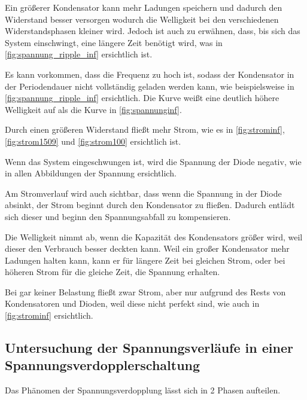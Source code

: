 \documentclass[11pt,ngerman]{scrartcl}
\begin{document}
Ein größerer Kondensator kann mehr Ladungen speichern und dadurch den Widerstand besser versorgen wodurch die Welligkeit bei den verschiedenen Widerstandsphasen kleiner wird.
Jedoch ist auch zu erwähnen, dass, bis sich das System einschwingt, eine längere Zeit benötigt wird, was in \autoref{fig:spannung_ripple_inf} ersichtlich ist.

Es kann vorkommen, dass die Frequenz zu hoch ist, sodass der Kondensator in der Periodendauer nicht vollständig geladen werden kann, wie beispielsweise in \autoref{fig:spannung_ripple_inf} ersichtlich. Die Kurve weißt eine deutlich höhere Welligkeit auf als die Kurve in \autoref{fig:spannunginf}.

\vspace{2mm}


Durch einen größeren Widerstand fließt mehr Strom, wie es in \autoref{fig:strominf}, \autoref{fig:strom1509} und \autoref{fig:strom100} ersichtlich ist.

Wenn das System eingeschwungen ist, wird die Spannung der Diode negativ, wie in allen Abbildungen der Spannung ersichtlich.

\vspace{2mm}

Am Stromverlauf wird auch sichtbar, dass wenn die Spannung in der Diode absinkt, der Strom beginnt durch den Kondensator zu fließen. Dadurch entlädt sich dieser und beginn den Spannungsabfall zu kompensieren.

Die Welligkeit nimmt ab, wenn die Kapazität des Kondensators größer wird, weil dieser den Verbrauch besser deckten kann.
Weil ein großer Kondensator mehr Ladungen halten kann, kann er für längere Zeit bei gleichen Strom, oder bei höheren Strom für die gleiche Zeit, die Spannung erhalten.

\vspace{2mm}

Bei gar keiner Belastung fließt zwar Strom, aber nur aufgrund des Rests von Kondensatoren und Dioden, weil diese nicht perfekt sind, wie auch in \autoref{fig:strominf} ersichtlich.



\subsection{Untersuchung der Spannungsverläufe in einer Spannungsverdopplerschaltung}



Das Phänomen der Spannungsverdopplung lässt sich in 2 Phasen aufteilen.
\end{document}
